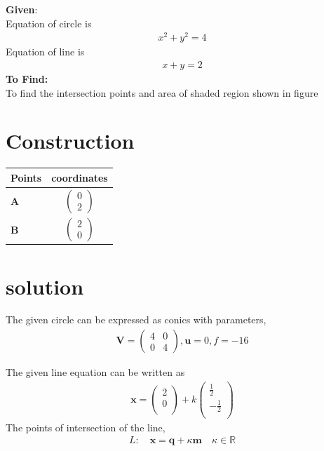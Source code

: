 \documentclass[journal,12pt,twocolumn]{IEEEtran}
\let\vec\mathbf
\newcommand{\myvec}[1]{\ensuremath{\begin{pmatrix}#1\end{pmatrix}}}
\begin{document}
\raggedright \textbf{Given}: \\
Equation of circle is  
\begin{align} x^2 + y^2 = 4
\end{align}
Equation of line is 
\begin{align}
x+y=2
\end{align}
\textbf{To Find:} \\
To find the intersection points and area of shaded region shown in figure\
\section{Construction}

\begin{table}[h!]
\begin{center}
\setlength{\arrayrulewidth}{0.5mm}
\renewcommand{\arraystretch}{1.5}
    \begin{tabular}{|l|c|}
    \hline 
    \textbf{Points} & \textbf{coordinates} \\ \hline
   $\vec{A}$ & $\myvec{
   0\\
   2
   } $ \\\hline
   $\vec{B}$ & $\myvec{
   2\\
   0
   } $ \\\hline
      \end{tabular}
  \end{center}
\end{table}
\newpage
\section{solution}
\fi
The given circle can be expressed as conics with parameters,
\begin{align}
\vec{V}=\myvec{
4 & 0\\
0 & 4
},
\vec{u}=0,
f=-16
\end{align}
\iffalse

The given line equation can be written as\\ 
\begin{align} 
	\vec{x}=\begin{pmatrix}2 \\ 0 \\ \end{pmatrix}+k\begin{pmatrix}\frac{1}{2} \\ -\frac{1}{2} \\ \end{pmatrix}
\end{align}
The points of intersection of the line, \\ 
\begin{align}
L: \quad \vec{x} = \vec{q} + \kappa \vec{m} \quad \kappa \in \mathbb{R}
\end{align}
\end{document}
